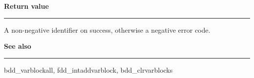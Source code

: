 \begin{minipage}{\textwidth}
\setlength{\parindent}{0em}\vspace{\parsep}\vspace{\baselineskip}\noindent
{\bf Return value}\\\rule[1.5ex]{\textwidth}{0.2mm}\vspace{-1.5ex}
A non-negative identifier on success, otherwise a negative error code. 

\vspace{\parsep}\vspace{\baselineskip}\noindent
{\bf See also}\\\rule[1.5ex]{\textwidth}{0.2mm}\vspace{-1.5ex}
bdd\_varblockall, fdd\_intaddvarblock, bdd\_clrvarblocks 
\end{minipage}
\vspace{8ex}

